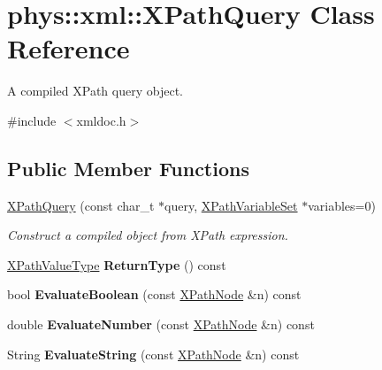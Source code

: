 \hypertarget{classphys_1_1xml_1_1XPathQuery}{
\section{phys::xml::XPathQuery Class Reference}
\label{de/d52/classphys_1_1xml_1_1XPathQuery}
}


A compiled XPath query object.  




{\ttfamily \#include $<$xmldoc.h$>$}

\subsection*{Public Member Functions}
\begin{DoxyCompactItemize}
\item 
\hyperlink{classphys_1_1xml_1_1XPathQuery_a1a63135370ef4999f3dd27540c9009a2}{XPathQuery} (const char\_\-t $\ast$query, \hyperlink{classphys_1_1xml_1_1XPathVariableSet}{XPathVariableSet} $\ast$variables=0)
\begin{DoxyCompactList}\small\item\em Construct a compiled object from XPath expression. \item\end{DoxyCompactList}\item 
\hypertarget{classphys_1_1xml_1_1XPathQuery_a35f84fa63de8cfd5c9abc5320cdf12fa}{
\hyperlink{namespacephys_1_1xml_a339b9eef674ba44100110e5524bc575d}{XPathValueType} {\bfseries ReturnType} () const }
\label{de/d52/classphys_1_1xml_1_1XPathQuery_a35f84fa63de8cfd5c9abc5320cdf12fa}

\item 
\hypertarget{classphys_1_1xml_1_1XPathQuery_a5c61bb5b5181be4b0c4c9c638d179564}{
bool {\bfseries EvaluateBoolean} (const \hyperlink{classphys_1_1xml_1_1XPathNode}{XPathNode} \&n) const }
\label{de/d52/classphys_1_1xml_1_1XPathQuery_a5c61bb5b5181be4b0c4c9c638d179564}

\item 
\hypertarget{classphys_1_1xml_1_1XPathQuery_aacfcff30901ce20b92de56ec0e2d70e5}{
double {\bfseries EvaluateNumber} (const \hyperlink{classphys_1_1xml_1_1XPathNode}{XPathNode} \&n) const }
\label{de/d52/classphys_1_1xml_1_1XPathQuery_aacfcff30901ce20b92de56ec0e2d70e5}

\item 
\hypertarget{classphys_1_1xml_1_1XPathQuery_ab7084be2e608b38872167fe3321554b9}{
String {\bfseries EvaluateString} (const \hyperlink{classphys_1_1xml_1_1XPathNode}{XPathNode} \&n) const }
\label{de/d52/classphys_1_1xml_1_1XPathQuery_ab7084be2e608b38872167fe3321554b9}


\end{DoxyCompactItemize}
